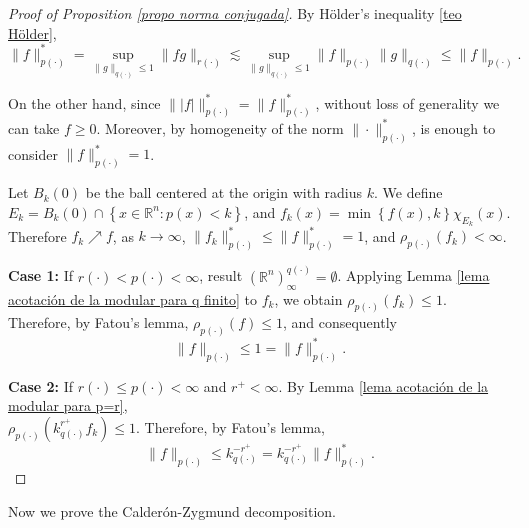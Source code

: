 \documentclass[a4paper,11pt,reqno]{amsart}
\theoremstyle{plain}
\numberwithin{equation}{section}
\theoremstyle{definition}
\newcommand{\R}{{\mathbb{R}^n}}
\begin{document}
\begin{proof}[Proof of Proposition \ref{propo norma conjugada}]
	By Hölder's inequality \ref{teo Hölder},
	\begin{equation*}
		\|f\|^\ast_{p(\cdot)}=\underset{\|g\|_{q(\cdot)}\leq1}{\sup}\|fg\|_{r(\cdot)}
		\lesssim\underset{\|g\|_{q(\cdot)}\leq1}{\sup}\|f\|_{p(\cdot)}\|g\|_{q(\cdot)}
		\leq\|f\|_{p(\cdot)}.
	\end{equation*}
	
	On the other hand, since $\||f|\|^\ast_{p(\cdot)}=\|f\|^\ast_{p(\cdot)}$, without loss of generality we can take $f\geq0$. Moreover, by homogeneity of the norm $\|\cdot\|^*_{p(\cdot)}$, is enough to consider $\|f\|^*_{p(\cdot)}=1$. 
	
	Let $B_k(0)$ be the ball centered at the origin with radius $k$. We define $E_k=B_k(0)\cap\left\{x\in\R:p(x)<k\right\}$, and $f_k(x)=\min\left\{f(x),k\right\} \chi_{E_k}(x)$. Therefore $f_k\nearrow f$, as $k \to \infty$,  $\|f_k\|^\ast_{p(\cdot)}\leq\|f\|^\ast_{p(\cdot)}=1$, and $\rho_{p(\cdot)}(f_k)<\infty$.
	 	
	\textbf{Case 1:} If $r(\cdot)<p(\cdot)<\infty$, result $(\R)^{q(\cdot)}_\infty=\emptyset$. Applying Lemma \ref{lema acotación de la modular para q finito} to $f_k$, we obtain $\rho_{p(\cdot)}(f_k)\leq1$. Therefore, by Fatou's lemma, $\rho_{p(\cdot)}(f)\leq1$, and consequently
	\begin{equation*}
	\|f\|_{p(\cdot)}\leq1=\|f\|^\ast_{p(\cdot)}.
	\end{equation*}
		
	\textbf{Case 2:} If $r(\cdot)\leq p(\cdot)<\infty$ and $r^+<\infty$. By Lemma \ref{lema acotación de la modular para p=r},\\ $\rho_{p(\cdot)}\left(k_{q(\cdot)}^{r^+} f_k\right)\leq 1$. Therefore, by Fatou's lemma,
	\begin{equation*}
		\|f\|_{p(\cdot)}\leq k_{q(\cdot)}^{-r^+}=k_{q(\cdot)}^{-r^+}\|f\|^\ast_{p(\cdot)}.
	\end{equation*} 
\end{proof}
Now we prove the Calderón-Zygmund decomposition.
\end{document}

